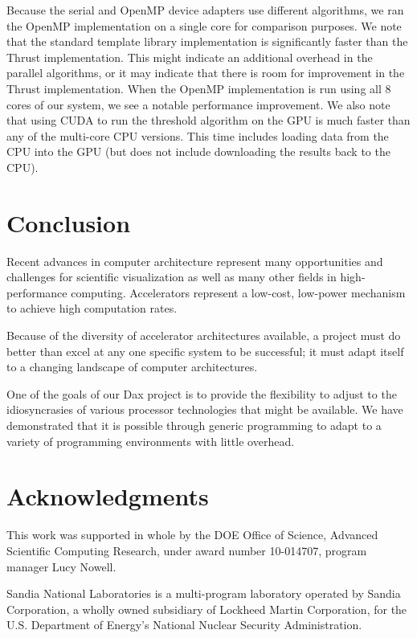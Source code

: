 \documentclass[conference]{IEEEtran}
\begin{document}
Because the serial and OpenMP device adapters use different algorithms, we
ran the OpenMP implementation on a single core for comparison purposes.  We
note that the standard template library implementation is significantly
faster than the Thrust implementation.  This might indicate an additional
overhead in the parallel algorithms, or it may indicate that there is room
for improvement in the Thrust implementation.  When the OpenMP
implementation is run using all 8 cores of our system, we see a notable
performance improvement.  We also note that using CUDA to run the threshold
algorithm on the GPU is much faster than any of the multi-core CPU
versions.  This time includes loading data from the CPU into the GPU (but
does not include downloading the results back to the CPU).

\section{Conclusion}
\label{sec:Conclusion}

\noindent
Recent advances in computer architecture represent many opportunities and
challenges for scientific visualization as well as many other fields in
high-performance computing.  Accelerators represent a low-cost, low-power
mechanism to achieve high computation rates.

Because of the diversity of accelerator architectures available, a project
must do better than excel at any one specific system to be successful; it
must adapt itself to a changing landscape of computer architectures.

One of the goals of our Dax project is to provide the flexibility to adjust
to the idiosyncrasies of various processor technologies that might be
available.  We have demonstrated that it is possible through generic
programming to adapt to a variety of programming environments with little
overhead.

\section*{Acknowledgments}

\noindent
This work was supported in whole by the DOE Office of Science, Advanced
Scientific Computing Research, under award number 10-014707, program
manager Lucy Nowell.

Sandia National Laboratories is a multi-program laboratory operated by
Sandia Corporation, a wholly owned subsidiary of Lockheed Martin
Corporation, for the U.S. Department of Energy's National Nuclear Security
Administration.



\end{document}
